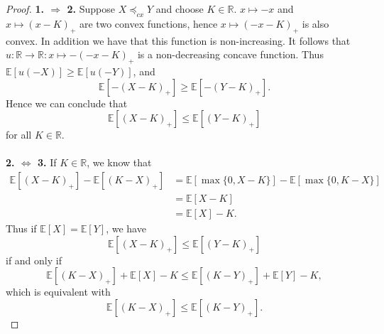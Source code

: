 \documentclass{article}
\begin{document}
\begin{proof}
\textbf{1. $\Rightarrow$ 2.} Suppose $X\preceq_{cx} Y$ and choose $K\in \mathbb{R}$. $x\mapsto -x$ and $x\mapsto (x-K)_+$ are two convex functions, hence $x\mapsto (-x-K)_+$ is also convex. In addition we have that this function is non-increasing. It follows that $u: \mathbb{R}\rightarrow \mathbb{R}: x\mapsto -(-x-K)_+$ is a non-decreasing concave function. Thus $\mathbb{E}[u(-X)] \geq \mathbb{E}[u(-Y)]$, and
$$\mathbb{E}[-(X - K)_+] \geq \mathbb{E}[-(Y-K)_+].$$
Hence we can conclude that
$$\mathbb{E}[(X - K)_+] \leq \mathbb{E}[(Y-K)_+]$$
for all $K\in \mathbb{R}$.
\\\\
\textbf{2. $\iff$ 3.} If $K\in \mathbb{R}$, we know that 
\begin{align*}
    \mathbb{E}[(X-K)_+] -\mathbb{E}[(K-X)_+] &= \mathbb{E}[\max\{0,X-K\}] - \mathbb{E}[\max\{0,K-X\}]\\
    &= \mathbb{E}[X-K] \\
    &= \mathbb{E}[X] - K.
\end{align*}
Thus if $\mathbb{E}[X] = \mathbb{E}[Y]$, we have
$$\mathbb{E}[(X-K)_+] \leq \mathbb{E}[(Y-K)_+]$$
if and only if
$$\mathbb{E}[(K-X)_+] + \mathbb{E}[X] - K \leq \mathbb{E}[(K-Y)_+] + \mathbb{E}[Y] - K,$$
which is equivalent with 
$$\mathbb{E}[(K-X)_+] \leq \mathbb{E}[(K-Y)_+].$$


\end{proof}
\end{document}
